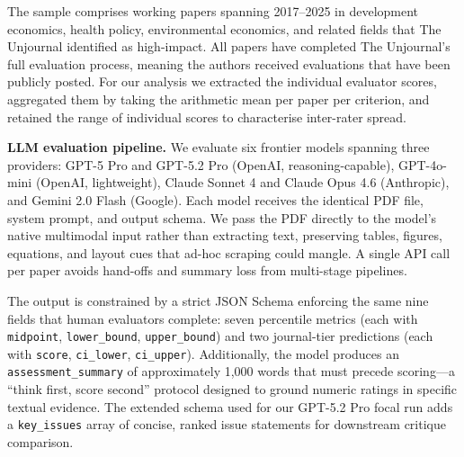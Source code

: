 \documentclass[
  11pt,
  letterpaper,
]{article}
\begin{document}
The sample comprises working papers spanning 2017--2025 in development
economics, health policy, environmental economics, and related fields
that The Unjournal identified as high-impact. All papers have completed
The Unjournal's full evaluation process, meaning the authors received
evaluations that have been publicly posted. For our analysis we
extracted the individual evaluator scores, aggregated them by taking the
arithmetic mean per paper per criterion, and retained the range of
individual scores to characterise inter-rater spread.

\textbf{LLM evaluation pipeline.} We evaluate six frontier models
spanning three providers: GPT-5 Pro and GPT-5.2 Pro (OpenAI,
reasoning-capable), GPT-4o-mini (OpenAI, lightweight), Claude Sonnet 4
and Claude Opus 4.6 (Anthropic), and Gemini 2.0 Flash (Google). Each
model receives the identical PDF file, system prompt, and output schema.
We pass the PDF directly to the model's native multimodal input rather
than extracting text, preserving tables, figures, equations, and layout
cues that ad-hoc scraping could mangle. A single API call per paper
avoids hand-offs and summary loss from multi-stage pipelines.

The output is constrained by a strict JSON Schema enforcing the same
nine fields that human evaluators complete: seven percentile metrics
(each with \texttt{midpoint}, \texttt{lower\_bound},
\texttt{upper\_bound}) and two journal-tier predictions (each with
\texttt{score}, \texttt{ci\_lower}, \texttt{ci\_upper}). Additionally,
the model produces an \texttt{assessment\_summary} of approximately
1,000 words that must precede scoring---a ``think first, score second''
protocol designed to ground numeric ratings in specific textual
evidence. The extended schema used for our GPT-5.2 Pro focal run adds a
\texttt{key\_issues} array of concise, ranked issue statements for
downstream critique comparison.
\end{document}
